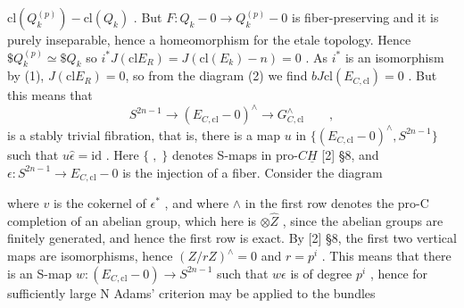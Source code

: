
$\mathrm{cl}(Q_k^{(p)}) - \mathrm{cl}(Q_k)$ .  But  $F:Q_k - 0 \to Q_k^{(p)} - 0$  is fiber-preserving
and it is purely inseparable, hence a homeomorphism for the etale
topology.  Hence  $\$Q_k^{(p)} \simeq \$Q_k$  so  $i^*J(\mathrm{cl}E_R) = J(\mathrm{cl}(E_k) - n) = 0$ .
As  $i^*$ is an isomorphism by (1), $J(\mathrm{cl}E_R) = 0$, so from the diagram
(2) we find  $bJ\mathrm{cl}(E_{C,\mathrm{cl}}) = 0$ .  But this means that
\[ S^{2n-1} \to (E_{C,\mathrm{cl}} - 0)^{\wedge} \to G^{\wedge}_{C,\mathrm{cl}} \qquad , \]
is a stably trivial fibration, that is, there is a map  $u$  in
$\{(E_{C,\mathrm{cl}} - 0)^{\wedge} , S^{2n-1}\}$  such that  $u\hat{\epsilon} = \mathrm{id}$ .  Here  $\{ \; , \; \}$  denotes
S-maps in pro-$C\underline{H}$  [2] §8, and  $\epsilon:S^{2n-1} \to E_{C,\mathrm{cl}} - 0$  is the injection
of a fiber.  Consider the diagram


where  $v$  is the cokernel of  $\epsilon^*$ , and where  $\wedge$  in the first row
denotes the pro-C completion of an abelian group, which here is  $\otimes\hat{Z}$ ,
since the abelian groups are finitely generated, and hence the first
row is exact.  By [2] §8, the first two vertical maps are isomorphisms,
hence  $(Z/rZ)^{\wedge} = 0$  and  $r = p^{i}$ .  This means that there is an S-map
$w:(E_{C,\mathrm{cl}} - 0) \to S^{2n-1}$  such that  $w\epsilon$  is of degree $p^{i}$ , hence for
sufficiently large  N  Adams' criterion may be applied to the bundles

